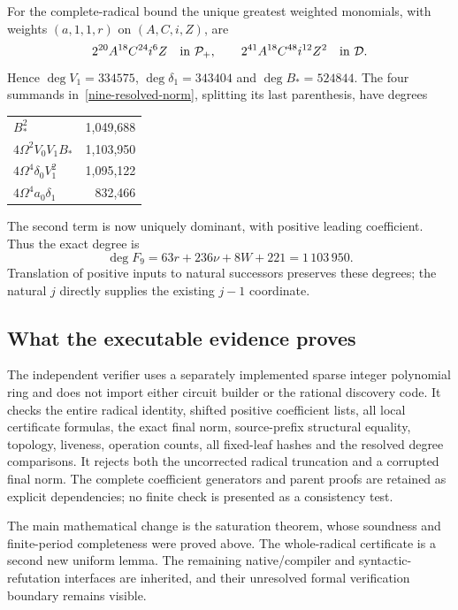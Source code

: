 For the complete-radical bound the unique greatest weighted monomials,
with weights $(a,1,1,r)$ on $(A,C,i,Z)$, are
\[
 2^{20}A^{18}C^{24}i^6Z\quad\hbox{in }\mathcal P_+,
 \qquad
 2^{41}A^{18}C^{48}i^{12}Z^2\quad\hbox{in }\mathcal D.
\]
Hence $\deg V_1=334575$, $\deg\delta_1=343404$ and
$\deg B_*=524844$.  The four summands in~\eqref{nine-resolved-norm},
splitting its last parenthesis, have degrees
\begin{center}
\begin{tabular}{lr}
$B_*^2$&1,049,688\\
$4\Omega^2V_0V_1B_*$&1,103,950\\
$4\Omega^4\delta_0V_1^2$&1,095,122\\
$4\Omega^4a_0\delta_1$&832,466
\end{tabular}
\end{center}
The second term is now uniquely dominant, with positive leading
coefficient.  Thus the exact degree is
\[
 \boxed{\deg F_9=63r+236\nu+8W+221=1\,103\,950.}
\]
Translation of positive inputs to natural successors preserves these
degrees; the natural $j$ directly supplies the existing $j-1$ coordinate.

\subsection{What the executable evidence proves}

The independent verifier uses a separately implemented sparse integer
polynomial ring and does not import either circuit builder or the rational
discovery code.  It checks the entire radical identity, shifted positive
coefficient lists, all local certificate formulas, the exact final norm,
source-prefix structural equality, topology, liveness, operation counts,
all fixed-leaf hashes and the resolved degree comparisons.  It rejects
both the uncorrected radical truncation and a corrupted final norm.
The complete coefficient generators and parent proofs are retained as
explicit dependencies; no finite check is presented as a consistency test.

The main mathematical change is the saturation theorem, whose soundness
and finite-period completeness were proved above.  The whole-radical
certificate is a second new uniform lemma.  The remaining native/compiler
and syntactic-refutation interfaces are inherited, and their unresolved
formal verification boundary remains visible.
